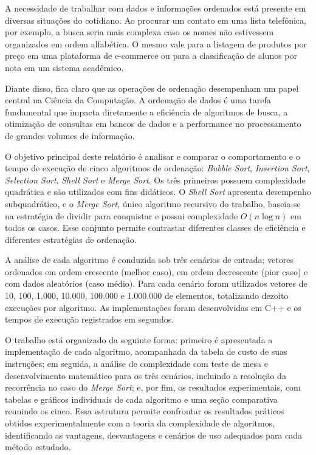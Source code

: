 \qquad A necessidade de trabalhar com dados e informações ordenados está presente em diversas situações do cotidiano. Ao procurar um contato em uma lista telefônica, por exemplo, a busca seria mais complexa caso os nomes não estivessem organizados em ordem alfabética. O mesmo vale para a listagem de produtos por preço em uma plataforma de e-commerce ou para a classificação de alunos por nota em um sistema acadêmico.

\qquad Diante disso, fica claro que as operações de ordenação desempenham um papel central na Ciência da Computação. A ordenação de dados é uma tarefa fundamental que impacta diretamente a eficiência de algoritmos de busca, a otimização de consultas em bancos de dados e a performance no processamento de grandes volumes de informação.

\qquad O objetivo principal deste relatório é analisar e comparar o comportamento e o tempo de execução de cinco algoritmos de ordenação: \textit{Bubble Sort}, \textit{Insertion Sort}, \textit{Selection Sort}, \textit{Shell Sort} e \textit{Merge Sort}. Os três primeiros possuem complexidade quadrática e são utilizados com fins didáticos. O \textit{Shell Sort} apresenta desempenho subquadrático, e o \textit{Merge Sort}, único algoritmo recursivo do trabalho, baseia-se na estratégia de dividir para conquistar e possui complexidade $O(n \log n)$ em todos os casos. Esse conjunto permite contrastar diferentes classes de eficiência e diferentes estratégias de ordenação.

\qquad A análise de cada algoritmo é conduzida sob três cenários de entrada: vetores ordenados em ordem crescente (melhor caso), em ordem decrescente (pior caso) e com dados aleatórios (caso médio). Para cada cenário foram utilizados vetores de 10, 100, 1.000, 10.000, 100.000 e 1.000.000 de elementos, totalizando dezoito execuções por algoritmo. As implementações foram desenvolvidas em C++ e os tempos de execução registrados em segundos.

\qquad O trabalho está organizado da seguinte forma: primeiro é apresentada a implementação de cada algoritmo, acompanhada da tabela de custo de suas instruções; em seguida, a análise de complexidade com teste de mesa e desenvolvimento matemático para os três cenários, incluindo a resolução da recorrência no caso do \textit{Merge Sort}; e, por fim, os resultados experimentais, com tabelas e gráficos individuais de cada algoritmo e uma seção comparativa reunindo os cinco. Essa estrutura permite confrontar os resultados práticos obtidos experimentalmente com a teoria da complexidade de algoritmos, identificando as vantagens, desvantagens e cenários de uso adequados para cada método estudado.
